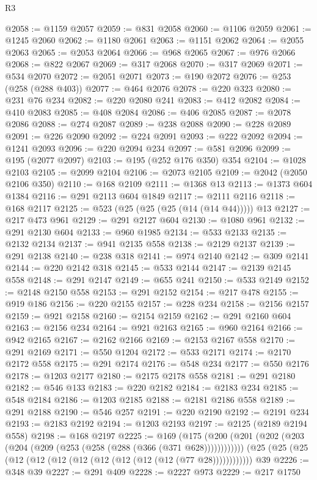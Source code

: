 \begin{lexlean}{R3}
\begin{coremodule}
@2058 := @1159 @2057
@2059 := @831 @2058
@2060 := @1106 @2059
@2061 := @1245 @2060
@2062 := @1180 @2061
@2063 := @1151 @2062
@2064 := @2055 @2063
@2065 := @2053 @2064
@2066 := @968 @2065
@2067 := @976 @2066
@2068 := @822 @2067
@2069 := @317 @2068
@2070 := @317 @2069
@2071 := @534 @2070
@2072 := @2051 @2071
@2073 := @190 @2072
@2076 := @253 (@258 (@288 @403))
@2077 := @464 @2076
@2078 := @220 @323
@2080 := @231 @76 @234
@2082 := @220 @2080 @241
@2083 := @412 @2082
@2084 := @410 @2083
@2085 := @408 @2084
@2086 := @406 @2085
@2087 := @2078 @2086
@2088 := @274 @2087
@2089 := @238 @2088
@2090 := @228 @2089
@2091 := @226 @2090
@2092 := @224 @2091
@2093 := @222 @2092
@2094 := @1241 @2093
@2096 := @220 @2094 @234
@2097 := @581 @2096
@2099 := @195 (@2077 @2097)
@2103 := @195 (@252 @176 @350) @354
@2104 := @1028 @2103
@2105 := @2099 @2104
@2106 := @2073 @2105
@2109 := @2042 (@2050 @2106 @350)
@2110 := @168 @2109
@2111 := @1368 @13
@2113 := @1373 @604 @1384
@2116 := @291 @2113 @604 @1849
@2117 := @2111 @2116
@2118 := @168 @2117
@2125 := @523 (@25 (@25 (@25 (@14 (@14 @44))))) @13
@2127 := @217 @473 @961
@2129 := @291 @2127 @604
@2130 := @1080 @961
@2132 := @291 @2130 @604
@2133 := @960 @1985
@2134 := @533 @2133
@2135 := @2132 @2134
@2137 := @941 @2135 @558
@2138 := @2129 @2137
@2139 := @291 @2138
@2140 := @238 @318
@2141 := @974 @2140
@2142 := @309 @2141
@2144 := @220 @2142 @318
@2145 := @533 @2144
@2147 := @2139 @2145 @558
@2148 := @291 @2147
@2149 := @655 @241
@2150 := @533 @2149
@2152 := @2148 @2150 @558
@2153 := @291 @2152
@2154 := @217 @478
@2155 := @919 @186
@2156 := @220 @2155
@2157 := @228 @234
@2158 := @2156 @2157
@2159 := @921 @2158
@2160 := @2154 @2159
@2162 := @291 @2160 @604
@2163 := @2156 @234
@2164 := @921 @2163
@2165 := @960 @2164
@2166 := @942 @2165
@2167 := @2162 @2166
@2169 := @2153 @2167 @558
@2170 := @291 @2169
@2171 := @550 @1204
@2172 := @533 @2171
@2174 := @2170 @2172 @558
@2175 := @291 @2174
@2176 := @548 @234
@2177 := @550 @2176
@2178 := @1203 @2177
@2180 := @2175 @2178 @558
@2181 := @291 @2180
@2182 := @546 @133
@2183 := @220 @2182
@2184 := @2183 @234
@2185 := @548 @2184
@2186 := @1203 @2185
@2188 := @2181 @2186 @558
@2189 := @291 @2188
@2190 := @546 @257
@2191 := @220 @2190
@2192 := @2191 @234
@2193 := @2183 @2192
@2194 := @1203 @2193
@2197 := @2125 (@2189 @2194 @558)
@2198 := @168 @2197
@2225 := @169
    (@175 (@200 (@201 (@202 (@203 (@204 (@209 (@253 (@258 (@288 (@366 (@371 @628))))))))))))
    (@25 (@25 (@25 (@12 (@12 (@12 (@12 (@12 (@12 (@12 (@12 (@77 @28))))))))))))
    @39
@2226 := @348 @39
@2227 := @291 @409
@2228 := @2227 @973
@2229 := @217 @1750

\end{coremodule}
\end{lexlean}
